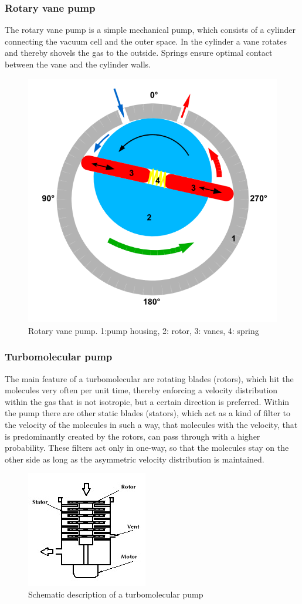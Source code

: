 \documentclass[a4paper]{scrartcl}
\numberwithin{equation}{section}
\numberwithin{figure}{section}
\numberwithin{table}{section}
\begin{document}
\subsubsection{Rotary vane pump}
The rotary vane pump is a simple mechanical pump, which consists of a cylinder connecting the vacuum cell and the outer space. In the cylinder a vane rotates and thereby shovels the gas to the outside. Springs ensure optimal contact between the vane and the cylinder walls. 

\begin{figure}
  \centering
   	\includegraphics[width=0.3\linewidth]{pic/rot.png}

 \caption{\small Rotary vane pump. 1:pump housing, 2: rotor, 3: vanes, 4: spring}
        \label{fig:rot}
\end{figure}



\subsubsection{Turbomolecular pump}
The main feature of a turbomolecular are rotating blades (rotors), which hit the molecules very often per unit time, thereby enforcing a velocity distribution within the gas that is not isotropic, but a certain direction is preferred. Within the pump there are other static blades (stators), which act as a kind of filter to the velocity of the molecules in such a way, that molecules with the velocity, that is predominantly created by the rotors, can pass through with a higher probability. These filters act only in one-way, so that the molecules stay on the other side as long as the asymmetric velocity distribution is maintained. 
\begin{figure}
  \centering
  
   	\includegraphics[width=0.3\linewidth]{pic/tu.jpg}

 \caption{\small Schematic description of a turbomolecular pump}
        \label{fig:turbo}
\end{figure}
\end{document}
